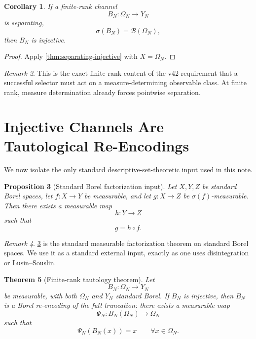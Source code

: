 \documentclass[11pt,a4paper]{article}
\newtheorem{theorem}{Theorem}[section]
\newtheorem{proposition}[theorem]{Proposition}
\newtheorem{corollary}[theorem]{Corollary}
\theoremstyle{definition}
\theoremstyle{remark}
\newtheorem{remark}[theorem]{Remark}
\newcommand{\cB}{\mathcal B}
\begin{document}
\begin{corollary}
\label{cor:finite-rank-injective}
If a finite-rank channel
\[
B_N:\Omega_N\to Y_N
\]
is separating,
\[
\sigma(B_N)=\cB(\Omega_N),
\]
then $B_N$ is injective.
\end{corollary}

\begin{proof}
Apply \cref{thm:separating-injective} with $X=\Omega_N$.
\end{proof}

\begin{remark}
This is the exact finite-rank content of the v42 requirement that a
successful selector must act on a measure-determining observable class.
At finite rank, measure determination already forces pointwise
separation.
\end{remark}

\section{Injective Channels Are Tautological Re-Encodings}

We now isolate the only standard descriptive-set-theoretic input used in
this note.

\begin{proposition}[Standard Borel factorization input]
\label{prop:factorization-input}
Let $X,Y,Z$ be standard Borel spaces, let $f:X\to Y$ be measurable, and
let $g:X\to Z$ be $\sigma(f)$-measurable.  Then there exists a
measurable map
\[
h:Y\to Z
\]
such that
\[
g=h\circ f.
\]
\end{proposition}

\begin{remark}
\cref{prop:factorization-input} is the standard measurable factorization
theorem on standard Borel spaces.  We use it as a standard external
input, exactly as one uses disintegration or Lusin--Souslin.
\end{remark}

\begin{theorem}[Finite-rank tautology theorem]
\label{thm:tautology}
Let
\[
B_N:\Omega_N\to Y_N
\]
be measurable, with both $\Omega_N$ and $Y_N$ standard Borel.  If
$B_N$ is injective, then $B_N$ is a Borel re-encoding of the full
truncation: there exists a measurable map
\[
\Psi_N:B_N(\Omega_N)\to \Omega_N
\]
such that
\[
\Psi_N(B_N(x))=x
\qquad
\forall x\in\Omega_N.
\]
\end{theorem}
\end{document}
